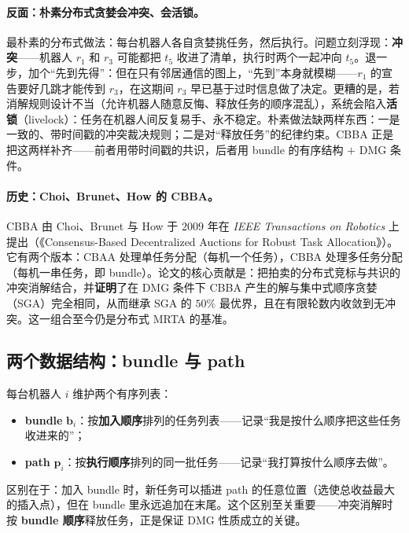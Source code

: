 \paragraph{反面：朴素分布式贪婪会冲突、会活锁。}
最朴素的分布式做法：每台机器人各自贪婪挑任务，然后执行。问题立刻浮现：\textbf{冲突}——机器人 $r_1$ 和 $r_3$ 可能都把 $t_5$ 收进了清单，执行时两个一起冲向 $t_5$。退一步，加个“先到先得”：但在只有邻居通信的图上，“先到”本身就模糊——$r_1$ 的宣告要好几跳才能传到 $r_3$，在这期间 $r_3$ 早已基于过时信息做了决定。更糟的是，若消解规则设计不当（允许机器人随意反悔、释放任务的顺序混乱），系统会陷入\textbf{活锁}（livelock）：任务在机器人间反复易手、永不稳定。朴素做法缺两样东西：一是一致的、带时间戳的冲突裁决规则；二是对“释放任务”的纪律约束。CBBA 正是把这两样补齐——前者用带时间戳的共识，后者用 bundle 的有序结构 $+$ DMG 条件。

\paragraph{历史：Choi、Brunet、How 的 CBBA。}
CBBA 由 Choi、Brunet 与 How 于 $2009$ 年在 \emph{IEEE Transactions on Robotics} 上提出（《Consensus-Based Decentralized Auctions for Robust Task Allocation》）\cite{choi2009cbba}。它有两个版本：CBAA 处理单任务分配（每机一个任务），CBBA 处理多任务分配（每机一串任务，即 bundle）。论文的核心贡献是：把拍卖的分布式竞标与共识的冲突消解结合，并\textbf{证明}了在 DMG 条件下 CBBA 产生的解与集中式顺序贪婪（SGA）完全相同，从而继承 SGA 的 $50\%$ 最优界，且在有限轮数内收敛到无冲突。这一组合至今仍是分布式 MRTA 的基准。

\subsection{两个数据结构：bundle 与 path}
\label{sec:mapf-cbba-struct}

每台机器人 $i$ 维护两个有序列表：

\begin{itemize}
  \item \textbf{bundle} $\mathbf{b}_i$：按\textbf{加入顺序}排列的任务列表——记录“我是按什么顺序把这些任务收进来的”；
  \item \textbf{path} $\mathbf{p}_i$：按\textbf{执行顺序}排列的同一批任务——记录“我打算按什么顺序去做”。
\end{itemize}

区别在于：加入 bundle 时，新任务可以插进 path 的任意位置（选使总收益最大的插入点），但在 bundle 里永远追加在末尾。这个区别至关重要——冲突消解时按 \textbf{bundle 顺序}释放任务，正是保证 DMG 性质成立的关键。

